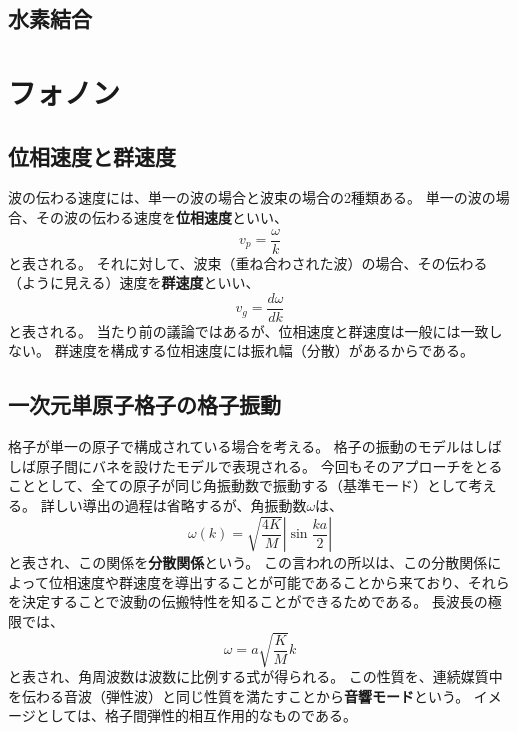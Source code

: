\documentclass[a4paper]{jsreport}
\begin{document}
        \section{水素結合}
        
    \chapter{フォノン}
        \section{位相速度と群速度}
            波の伝わる速度には、単一の波の場合と波束の場合の2種類ある。
            単一の波の場合、その波の伝わる速度を\textbf{位相速度}といい、
            \begin{equation}
                v_p = \frac{\omega}{k}
            \end{equation}
            と表される。
            それに対して、波束（重ね合わされた波）の場合、その伝わる（ように見える）速度を\textbf{群速度}といい、
            \begin{equation}
                v_g = \frac{d\omega}{dk}
            \end{equation}
            と表される。
            当たり前の議論ではあるが、位相速度と群速度は一般には一致しない。
            群速度を構成する位相速度には振れ幅（分散）があるからである。

        \section{一次元単原子格子の格子振動}
            格子が単一の原子で構成されている場合を考える。
            格子の振動のモデルはしばしば原子間にバネを設けたモデルで表現される。
            今回もそのアプローチをとることとして、全ての原子が同じ角振動数で振動する（基準モード）として考える。
            詳しい導出の過程は省略するが、角振動数$\omega$は、
            \begin{equation}
                \omega(k) = \sqrt{\frac{4K}{M}} \left|\sin{\frac{ka}{2}} \right|
            \end{equation}
            と表され、この関係を\textbf{分散関係}という。
            この言われの所以は、この分散関係によって位相速度や群速度を導出することが可能であることから来ており、それらを決定することで波動の伝搬特性を知ることができるためである。
            長波長の極限では、
            \begin{equation}
                \omega = a \sqrt{\frac{K}{M}}k
            \end{equation}
            と表され、角周波数は波数に比例する式が得られる。
            この性質を、連続媒質中を伝わる音波（弾性波）と同じ性質を満たすことから\textbf{音響モード}という。
            イメージとしては、格子間弾性的相互作用的なものである。
\end{document}
